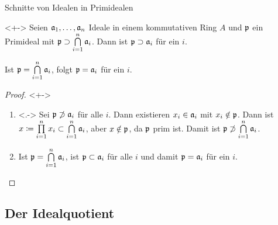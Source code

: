 \begin{frame}{Schnitte von Idealen in Primidealen}
    \begin{proposition}<+->
        Seien \(\mathfrak{a}_1, \dotsc, \mathfrak{a}_n\) Ideale in einem kommutativen
        Ring \(A\) und \(\mathfrak{p}\) ein Primideal mit \(\mathfrak{p} \supset
        \bigcap\limits_{i = 1}^n \mathfrak{a}_i\). Dann ist \(\mathfrak{p} \supset
        \mathfrak{a}_i\) für ein \(i\).
        
        Ist \(\mathfrak{p} = \bigcap\limits_{i = 1}^n \mathfrak{a}_i\), folgt
        \(\mathfrak{p} = \mathfrak{a}_i\) für ein \(i\).
    \end{proposition}
    \begin{proof}<+->
        \begin{enumerate}[<+->]
        \item<.->
            Sei \(\mathfrak{p} \not\supset \mathfrak{a}_i\) für alle \(i\). Dann
            existieren \(x_i \in \mathfrak{a}_i\) mit \(x_i \notin \mathfrak{p}\).
            Dann ist \(x \coloneqq \prod\limits_{i = 1}^n x_i \subset
            \bigcap\limits_{i = 1}^n \mathfrak{a}_i\), aber \(x \notin \mathfrak{p}\),
            da \(\mathfrak{p}\) prim ist. Damit ist \(\mathfrak{p} \not\supset
            \bigcap\limits_{i = 1}^n \mathfrak{a}_i\).
        \item
            Ist \(\mathfrak{p} = \bigcap\limits_{i = 1}^n \mathfrak{a}_i\), ist
            \(\mathfrak{p} \subset \mathfrak{a}_i\) für alle \(i\) und damit \(\mathfrak{p}
            = \mathfrak{a}_i\) für ein \(i\).
            \qedhere
        \end{enumerate}
    \end{proof}
\end{frame}

\subsection{Der Idealquotient}

